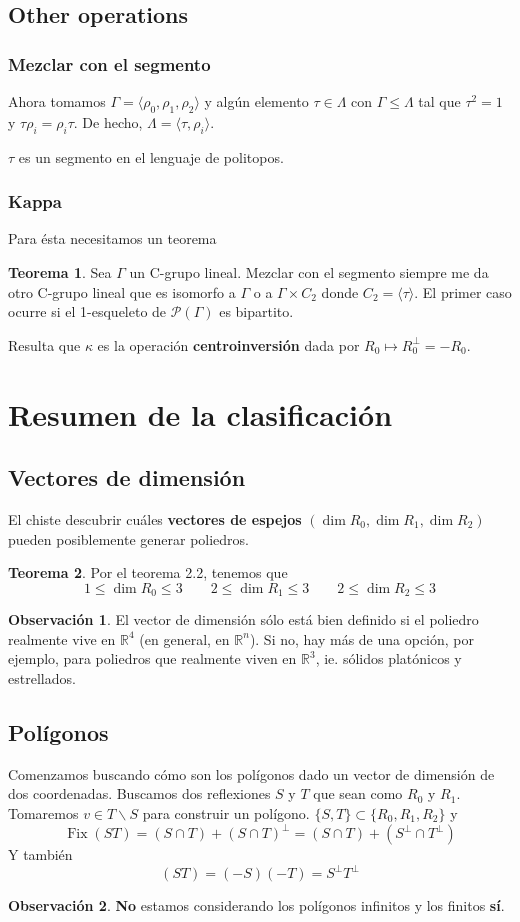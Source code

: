 \documentclass[spanish]{article}
\theoremstyle{definition}
\newtheorem*{obs}{Observación}
\newtheorem*{teo}{Teorema}
\newcommand{\R}{\mathbb{R}}
\newcommand{\p}{\mathcal{P}}
\DeclareMathOperator{\Fix}{Fix}
\begin{document}
\subsection{Other operations}
\subsubsection{Mezclar con el segmento}
Ahora tomamos $\Gamma=\langle\rho_0,\rho_1,\rho_2\rangle$ y algún elemento $\tau\in\Lambda$ con $\Gamma\leq\Lambda$ tal que $\tau^2=1$ y $\tau\rho_i=\rho_i\tau$. De hecho, $\Lambda=\langle\tau,\rho_i\rangle$.

$\tau$ es un segmento en el lenguaje de politopos.

\subsubsection{Kappa}
Para ésta necesitamos un teorema
\begin{teo}
	Sea $\Gamma$ un C-grupo lineal. Mezclar con el segmento siempre me da otro C-grupo lineal que es isomorfo a $\Gamma$ o a $\Gamma\times C_2$ donde $C_2=\langle\tau\rangle$. El primer caso ocurre si el 1-esqueleto de $\p(\Gamma)$ es bipartito.
\end{teo}

Resulta que $\kappa$ es la operación \textbf{centroinversión} dada por $R_0\mapsto R_0^\perp=-R_0$.

\section{Resumen de la clasificación}
\subsection{Vectores de dimensión}
El chiste descubrir cuáles \textbf{vectores de espejos} $(\dim R_0,\dim R_1,\dim R_2)$ pueden posiblemente generar poliedros.
\begin{teo}Por el teorema 2.2, tenemos que
\[1\leq\dim R_0\leq3\qquad2\leq\dim R_1\leq3\qquad2\leq\dim R_2\leq 3\]
\end{teo}
\begin{obs}
	El vector de dimensión sólo está bien definido si el poliedro realmente vive en $\R^4$ (en general, en $\R^n$). Si no, hay más de una opción, por ejemplo, para poliedros que realmente viven en $\R^3$, ie. sólidos platónicos y estrellados.
\end{obs}

\subsection{Polígonos}
Comenzamos buscando cómo son los polígonos dado un vector de dimensión de dos coordenadas. Buscamos dos reflexiones $S$ y $T$ que sean como $R_0$ y $R_1$. Tomaremos $v\in T\backslash S$ para construir un polígono.
$\{S,T\}\subset\{R_0,R_1,R_2\}$ y
\[\Fix(ST)=(S\cap T)+(S\cap T)^\perp=(S\cap T)+(S^\perp\cap T^\perp)\]
Y también
\[(ST)=(-S)(-T)=S^\perp T^\perp\]
\begin{obs}
	\textbf{No} estamos considerando los polígonos infinitos y los finitos \textbf{sí}.
\end{obs}
\end{document}
